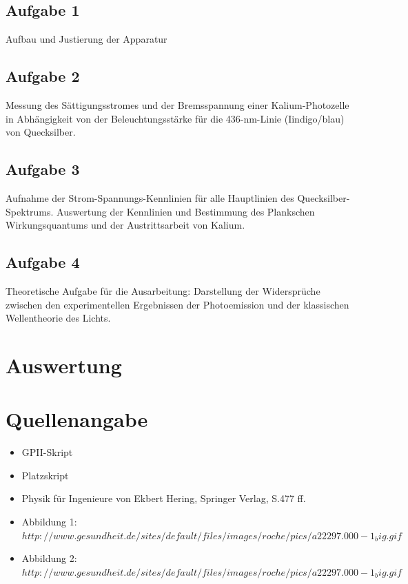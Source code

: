\documentclass{article}
\begin{document}
\subsection{Aufgabe 1}
Aufbau und Justierung der Apparatur

\subsection{Aufgabe 2}
Messung des Sättigungsstromes und der Bremsspannung einer Kalium-Photozelle in Abhängigkeit von der Beleuchtungsstärke für die 436-nm-Linie (Iindigo/blau) von Quecksilber.

\subsection{Aufgabe 3}
Aufnahme der Strom-Spannungs-Kennlinien für alle Hauptlinien des Quecksilber-Spektrums. Auswertung der Kennlinien und Bestimmung des Plankschen Wirkungsquantums und der Austrittsarbeit von Kalium.

\subsection{Aufgabe 4}
Theoretische Aufgabe für die Ausarbeitung: Darstellung der Widersprüche zwischen den experimentellen Ergebnissen der Photoemission und der klassischen Wellentheorie des Lichts.

\newpage
\section{Auswertung}








\section{Quellenangabe}
\begin{itemize}
\item GPII-Skript
\item Platzskript
\item Physik für Ingenieure von Ekbert Hering, Springer Verlag, S.477 ff.
\item Abbildung 1: \(http://www.gesundheit.de/sites/default/files/images/roche/pics/a22297.000-1_big.gif\)
\item Abbildung 2:  \(http://www.gesundheit.de/sites/default/files/images/roche/pics/a22297.000-1_big.gif\)
\end{itemize}
\end{document}
